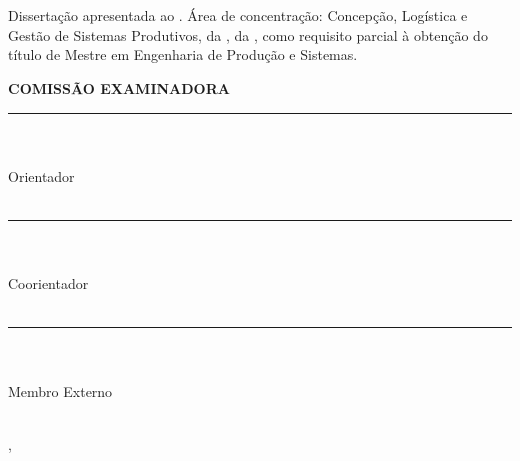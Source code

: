 \begin{center}
    {\singlespacing
    \MakeUppercase{\textbf{\aluno}} \\ [1cm]

    \MakeUppercase{\textbf{\titulo}} \\ [1cm]

    \hspace{.45\textwidth} %
        \begin{minipage}{.5\textwidth}
        \noindent Dissertação apresentada ao \curso. Área de concentração: Concepção, Logística e Gestão de Sistemas Produtivos, da \departamento, da \universidade, como requisito parcial à obtenção do título de Mestre em Engenharia de Produção e Sistemas. \\ [5mm]
        \end{minipage}
    \textbf{COMISSÃO EXAMINADORA} \\ [1cm]
    
    \rule{10cm}{.1mm} \\ \orientador \\ Orientador\\ \universidade \\ [10mm]

    \rule{10cm}{.1mm} \\ \coorientador \\ Coorientador \\ \universidade \\ [10mm]

    \rule{10cm}{.1mm} \\ \convidadoa \\ Membro Externo \\ \univconvidadoa \\ [10mm]
    
    
    \vfill
    
    \cidade, \datadefesa
    }
\end{center}

